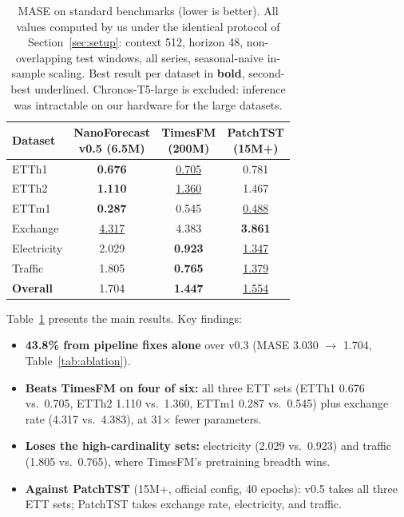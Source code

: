 \documentclass[11pt]{article}
\begin{document}
\begin{table}[t]
\centering
\caption{MASE on standard benchmarks (lower is better). All values computed by us under the identical protocol of Section~\ref{sec:setup}: context 512, horizon 48, non-overlapping test windows, all series, seasonal-naive in-sample scaling. Best result per dataset in \textbf{bold}, second-best underlined. Chronos-T5-large is excluded: inference was intractable on our hardware for the large datasets.}
\label{tab:main}
\small
\begin{tabular}{lccc}
\toprule
Dataset &
  \makecell{\textbf{NanoForecast}\\\textbf{v0.5 (6.5M)}} &
  \makecell{TimesFM\\(200M)} &
  \makecell{PatchTST\\(15M+)}\\
\midrule
ETTh1       & \textbf{0.676} & \underline{0.705} & 0.781 \\
ETTh2       & \textbf{1.110} & \underline{1.360} & 1.467 \\
ETTm1       & \textbf{0.287} & 0.545  & \underline{0.488} \\
Exchange    & \underline{4.317} & 4.383 & \textbf{3.861} \\
Electricity & 2.029 & \textbf{0.923} & \underline{1.347} \\
Traffic     & 1.805 & \textbf{0.765} & \underline{1.379} \\
\midrule
\textbf{Overall} & 1.704 & \textbf{1.447} & \underline{1.554} \\
\bottomrule
\end{tabular}
\end{table}

Table~\ref{tab:main} presents the main results. Key findings:

\begin{itemize}
\item \textbf{43.8\% from pipeline fixes alone} over v0.3 (MASE 3.030 $\to$ 1.704, Table~\ref{tab:ablation}).
\item \textbf{Beats TimesFM on four of six:} all three ETT sets (ETTh1 0.676 vs.\ 0.705, ETTh2 1.110 vs.\ 1.360, ETTm1 0.287 vs.\ 0.545) plus exchange rate (4.317 vs.\ 4.383), at 31$\times$ fewer parameters.
\item \textbf{Loses the high-cardinality sets:} electricity (2.029 vs.\ 0.923) and traffic (1.805 vs.\ 0.765), where TimesFM's pretraining breadth wins.
\item \textbf{Against PatchTST} (15M+, official config, 40 epochs): v0.5 takes all three ETT sets; PatchTST takes exchange rate, electricity, and traffic.
\end{itemize}
\end{document}
